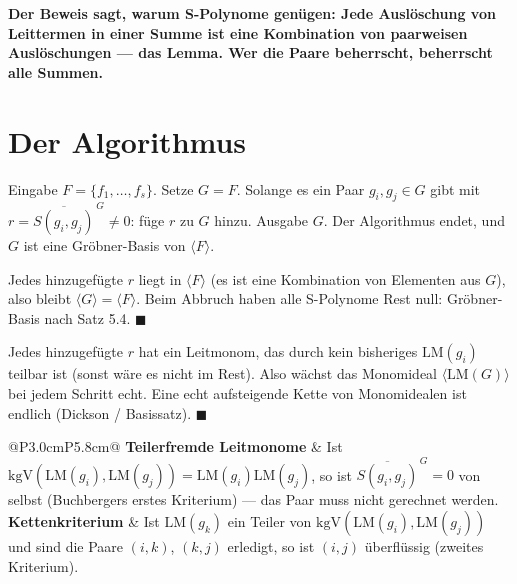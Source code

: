 \begin{merksatz}
\begin{center}
\begin{minipage}{0.9\textwidth}
\textbf{Der Beweis sagt, warum S-Polynome genügen: Jede Auslöschung von Leittermen in einer Summe ist eine Kombination von paarweisen Auslöschungen --- das Lemma. Wer die Paare beherrscht, beherrscht alle Summen.}
\end{minipage}
\end{center}
\end{merksatz}

\section{Der Algorithmus}

\begin{merksatz}
Eingabe $F = \{f_1, \ldots, f_s\}$. Setze $G = F$. Solange es ein Paar $g_i, g_j\in G$ gibt mit $r = \overline{S(g_i, g_j)}^{\,G}\ne0$: füge $r$ zu $G$ hinzu. Ausgabe $G$. Der Algorithmus endet, und $G$ ist eine Gröbner-Basis von $\langle F\rangle$.

Jedes hinzugefügte $r$ liegt in $\langle F\rangle$ (es ist eine Kombination von Elementen aus $G$), also bleibt $\langle G\rangle = \langle F\rangle$. Beim Abbruch haben alle S-Polynome Rest null: Gröbner-Basis nach Satz 5.4. $\blacksquare$

Jedes hinzugefügte $r$ hat ein Leitmonom, das durch kein bisheriges $\mathrm{LM}(g_i)$ teilbar ist (sonst wäre es nicht im Rest). Also wächst das Monomideal $\langle\mathrm{LM}(G)\rangle$ bei jedem Schritt echt. Eine echt aufsteigende Kette von Monomidealen ist endlich (Dickson / Basissatz). $\blacksquare$

\begin{center}
{\small
\renewcommand{\arraystretch}{1.5}
\begin{tabular}{@{}P{3.0cm}P{5.8cm}@{}}
\toprule
\textbf{Teilerfremde Leitmonome} & Ist $\mathrm{kgV}(\mathrm{LM}(g_i), \mathrm{LM}(g_j)) = \mathrm{LM}(g_i)\mathrm{LM}(g_j)$, so ist $\overline{S(g_i, g_j)}^{\,G} = 0$ von selbst (Buchbergers erstes Kriterium) --- das Paar muss nicht gerechnet werden.\\
\textbf{Kettenkriterium} & Ist $\mathrm{LM}(g_k)$ ein Teiler von $\mathrm{kgV}(\mathrm{LM}(g_i), \mathrm{LM}(g_j))$ und sind die Paare $(i,k)$, $(k,j)$ erledigt, so ist $(i,j)$ überflüssig (zweites Kriterium).\\
\bottomrule
\end{tabular}}
\end{center}


\end{merksatz}
